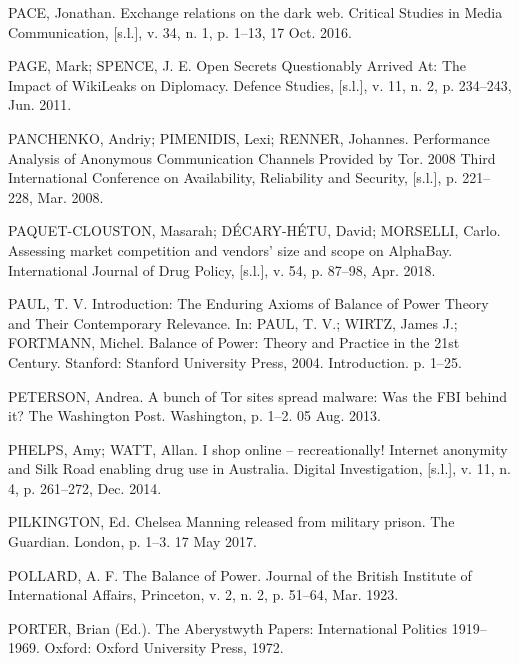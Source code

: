 \begin{list}{}{\setlength{\leftmargin}{0pt}\setlength{\itemsep}{6pt}\setlength{\parsep}{0pt}}
\item PACE, Jonathan. Exchange relations on the dark web. Critical Studies in Media Communication, [s.l.], v. 34, n. 1, p. 1--13, 17 Oct. 2016.

\item PAGE, Mark; SPENCE, J. E. Open Secrets Questionably Arrived At: The Impact of WikiLeaks on Diplomacy. Defence Studies, [s.l.], v. 11, n. 2, p. 234--243, Jun. 2011.

\item PANCHENKO, Andriy; PIMENIDIS, Lexi; RENNER, Johannes. Performance Analysis of Anonymous Communication Channels Provided by Tor. 2008 Third International Conference on Availability, Reliability and Security, [s.l.], p. 221--228, Mar. 2008.

\item PAQUET-CLOUSTON, Masarah; D\'ECARY-H\'ETU, David; MORSELLI, Carlo. Assessing market competition and vendors' size and scope on AlphaBay. International Journal of Drug Policy, [s.l.], v. 54, p. 87--98, Apr. 2018.

\item PAUL, T. V. Introduction: The Enduring Axioms of Balance of Power Theory and Their Contemporary Relevance. In: PAUL, T. V.; WIRTZ, James J.; FORTMANN, Michel. Balance of Power: Theory and Practice in the 21st Century. Stanford: Stanford University Press, 2004. Introduction. p. 1--25.

\item PETERSON, Andrea. A bunch of Tor sites spread malware: Was the FBI behind it? The Washington Post. Washington, p. 1--2. 05 Aug. 2013.

\item PHELPS, Amy; WATT, Allan. I shop online -- recreationally! Internet anonymity and Silk Road enabling drug use in Australia. Digital Investigation, [s.l.], v. 11, n. 4, p. 261--272, Dec. 2014.

\item PILKINGTON, Ed. Chelsea Manning released from military prison. The Guardian. London, p. 1--3. 17 May 2017.

\item POLLARD, A. F. The Balance of Power. Journal of the British Institute of International Affairs, Princeton, v. 2, n. 2, p. 51--64, Mar. 1923.

\item PORTER, Brian (Ed.). The Aberystwyth Papers: International Politics 1919--1969. Oxford: Oxford University Press, 1972.


\end{list}
